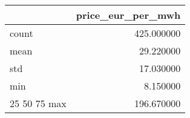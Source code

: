 \begin{tabular}{lr}
\toprule
 & price_eur_per_mwh \\
\midrule
count & 425.000000 \\
mean & 29.220000 \\
std & 17.030000 \\
min & 8.150000 \\
25%
50%
75%
max & 196.670000 \\
\bottomrule
\end{tabular}
